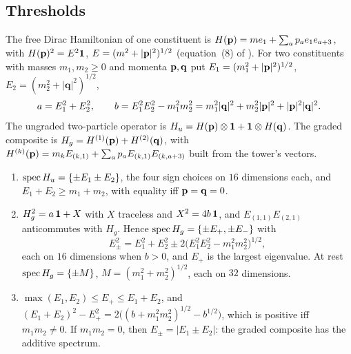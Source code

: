 \subsection{Thresholds}
\label{e2:sec:threshold}

The free Dirac Hamiltonian of one constituent is $H(\mathbf p)=me_1+\sum_ap_ae_1e_{a+3}$, with $H(\mathbf p)^2=E^2\mathbf 1$, $E=(m^2+|\mathbf p|^2)^{1/2}$ (equation~(8) of
\cite{ES17}). For two constituents with masses $m_1,m_2\ge0$ and momenta $\mathbf p,\mathbf q$ put $E_1=(m_1^2+|\mathbf p|^2)^{1/2}$, $E_2=(m_2^2+|\mathbf q|^2)^{1/2}$,
\[
a=E_1^2+E_2^2,\qquad b=E_1^2E_2^2-m_1^2m_2^2=m_1^2|\mathbf q|^2+m_2^2|\mathbf p|^2+|\mathbf p|^2|\mathbf q|^2 .
\]
The ungraded two-particle operator is $H_u=H(\mathbf p)\otimes\mathbf 1+\mathbf 1\otimes H(\mathbf q)$. The graded composite is
$H_g=H^{(1)}(\mathbf p)+H^{(2)}(\mathbf q)$, with $H^{(k)}(\mathbf p)=m_kE_{(k,1)}+\sum_ap_aE_{(k,1)}E_{(k,a+3)}$ built from the tower's vectors.

\begin{proposition}[Thresholds]
\label{e2:prop:threshold}
\begin{enumerate}[label=(\roman*),leftmargin=2.2em]
\item $\operatorname{spec} H_u=\{\pm E_1\pm E_2\}$, the four sign choices on $16$ dimensions each, and $E_1+E_2\ge m_1+m_2$, with equality iff $\mathbf p=\mathbf q=0$.
\item $H_g^2=a\,\mathbf 1+X$ with $X$ traceless and $X^2=4b\,\mathbf 1$, and $E_{(1,1)}E_{(2,1)}$ anticommutes with $H_g$. Hence $\operatorname{spec} H_g=\{\pm E_+,\pm E_-\}$ with
\[
E_\pm^2=E_1^2+E_2^2\pm2\bigl(E_1^2E_2^2-m_1^2m_2^2\bigr)^{1/2},
\]
each on $16$ dimensions when $b>0$, and $E_+$ is the largest eigenvalue. At rest $\operatorname{spec} H_g=\{\pm M\}$, $M=(m_1^2+m_2^2)^{1/2}$, each on $32$
dimensions.
\item $\max(E_1,E_2)\le E_+\le E_1+E_2$, and $(E_1+E_2)^2-E_+^2=2\bigl((b+m_1^2m_2^2)^{1/2}-b^{1/2}\bigr)$, which is positive iff $m_1m_2\neq0$. If
$m_1m_2=0$, then $E_\pm=|E_1\pm E_2|$: the graded composite has the additive spectrum.
\end{enumerate}
\end{proposition}

